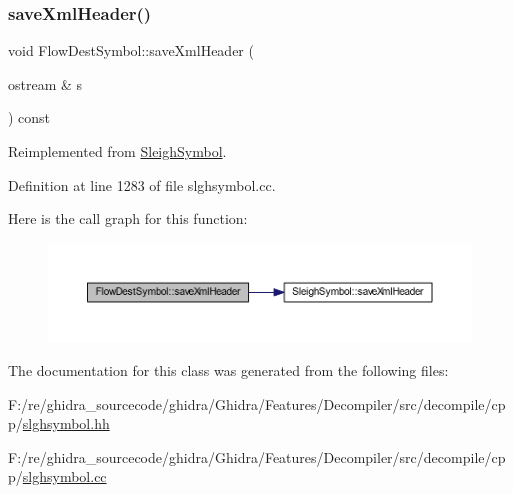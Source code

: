 \subsubsection{\texorpdfstring{saveXmlHeader()}{saveXmlHeader()}}
{\footnotesize\ttfamily void Flow\+Dest\+Symbol\+::save\+Xml\+Header (\begin{DoxyParamCaption}\item[{ostream \&}]{s }\end{DoxyParamCaption}) const\hspace{0.3cm}{\ttfamily [virtual]}}



Reimplemented from \mbox{\hyperlink{class_sleigh_symbol_ac501be7c584bc0568c29fb95910962e9}{Sleigh\+Symbol}}.



Definition at line 1283 of file slghsymbol.\+cc.

Here is the call graph for this function\+:
\nopagebreak
\begin{figure}[H]
\begin{center}
\leavevmode
\includegraphics[width=350pt]{class_flow_dest_symbol_a5e0a88af96879af7f778fdbc0bfa0a27_cgraph}
\end{center}
\end{figure}


The documentation for this class was generated from the following files\+:\begin{DoxyCompactItemize}
\item 
F\+:/re/ghidra\+\_\+sourcecode/ghidra/\+Ghidra/\+Features/\+Decompiler/src/decompile/cpp/\mbox{\hyperlink{slghsymbol_8hh}{slghsymbol.\+hh}}\item 
F\+:/re/ghidra\+\_\+sourcecode/ghidra/\+Ghidra/\+Features/\+Decompiler/src/decompile/cpp/\mbox{\hyperlink{slghsymbol_8cc}{slghsymbol.\+cc}}\end{DoxyCompactItemize}
